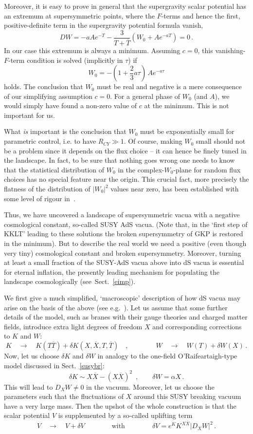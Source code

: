 \documentclass[12pt]{article}
\newcommand{\be}{\begin{equation}}
\newcommand{\ee}{\end{equation}}
\numberwithin{equation}{section}
\begin{document}
Moreover, it is easy to prove in general that the supergravity scalar potential has an extremum at supersymmetric points, where the $F$-terms and hence the first, positive-definite term in the supergravity potential formula vanish,
\be
DW=-aAe^{-T}-\frac{3}{T+\overline{T}}\left(W_0+Ae^{-aT}\right)=0\,.
\ee
In our case this extremum is always a minimum. Assuming $c=0$, this vanishing-$F$-term condition is solved (implicitly in $\tau$) if
\be
W_0=-\left(1+\frac{2}{3}a\tau\right)\,Ae^{-a\tau}
\ee
holds. The conclusion that $W_0$ must be real and negative is a mere consequence of our simplifying assumption $c=0$. For a general phase of $W_0$ (and $A$), we would simply have found a non-zero value of $c$ at the minimum. This is not important for us. 

What {\it is} important is the conclusion that $W_0$ must be exponentially small for parametric control, i.e. to have $R_{CY}\gg 1$. Of course, making $W_0$ small should not be a problem since it depends on the flux choice -- it can hence be finely tuned in the landscape. In fact, to be sure that nothing goes wrong one needs to know that the statistical distribution of $W_0$ in the complex-$W_0$-plane for random flux choices has no special feature near the origin. This crucial fact, more precisely the flatness of the distribution of $|W_0|^2$ values near zero, has been established with some level of rigour in~\cite{Denef:2004ze}.

Thus, we have uncovered a landscape of supersymmetric vacua with a negative cosmological constant, so-called SUSY AdS vacua. (Note that, in the `first step of KKLT' leading to these solutions the broken supersymmetry of GKP is restored in the minimum). But to describe the real world we need a positive (even though very tiny) cosmological constant and broken supersymmetry. Moreover, turning at least a small fraction of the SUSY-AdS vacua above into dS vacua is essential for eternal inflation, the presently leading mechanism for populating the landscape cosmologically (see~Sect.~\ref{eimp}). 

We first give a much simplified, `macroscopic' description of how dS vacua may arise on the basis of the above (see e.g.~\cite{Luty:2002hj, Choi:2005ge, Brummer:2006dg, Dudas:2006gr}). Let us assume that some further details of the model, such as branes with their gauge theories and charged matter fields, introduce extra light degrees of freedom $X$ and corresponding corrections to $K$ and $W$:
\be
K\quad\to\quad K(T\overline{T})+\delta K(X,\overline{X},T,\overline{T})\quad,\qquad \qquad
W\quad\to\quad W(T)+\delta W(X)\,.
\ee
Now, let us choose $\delta K$ and $\delta W$ in analogy to the one-field O'Raifeartaigh-type model discussed in Sect.~\ref{susybr}:
\be
\delta K\sim X\overline{X}-(X\overline{X})^2\,\,\,,\qquad \delta W=\alpha X\,.
\ee
This will lead to $D_XW\neq 0$ in the vacuum. Moreover, let us choose the parameters such that the fluctuations of $X$ around this SUSY breaking vacuum have a very large mass. Then the upshot of the whole construction is that the scalar potential $V$ is supplemented by a so-called uplifting term 
\be
V\quad\to\quad V+\delta V\qquad \qquad\mbox{with}\qquad \qquad 
\delta V=e^K K^{X\overline{X}}|D_XW|^2\,.
\ee
\end{document}
